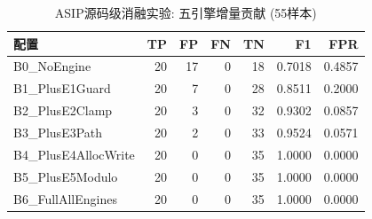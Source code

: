 \begin{table}[htbp]
\centering
\caption{ASIP源码级消融实验: 五引擎增量贡献 (55样本)}
\label{tab:asip_ablation}
\begin{tabular}{lrrrrrr}
\toprule
配置 & TP & FP & FN & TN & F1 & FPR \\
\midrule
B0_NoEngine & 20 & 17 & 0 & 18 & 0.7018 & 0.4857 \\
B1_PlusE1Guard & 20 & 7 & 0 & 28 & 0.8511 & 0.2000 \\
B2_PlusE2Clamp & 20 & 3 & 0 & 32 & 0.9302 & 0.0857 \\
B3_PlusE3Path & 20 & 2 & 0 & 33 & 0.9524 & 0.0571 \\
B4_PlusE4AllocWrite & 20 & 0 & 0 & 35 & 1.0000 & 0.0000 \\
B5_PlusE5Modulo & 20 & 0 & 0 & 35 & 1.0000 & 0.0000 \\
B6_FullAllEngines & 20 & 0 & 0 & 35 & 1.0000 & 0.0000 \\
\bottomrule
\end{tabular}
\end{table}